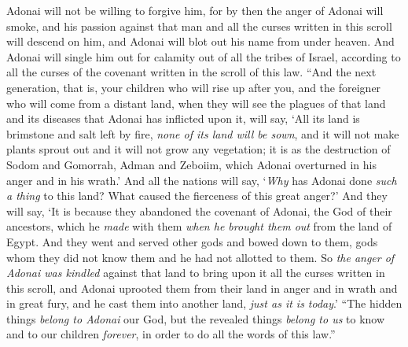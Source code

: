 \begin{biblechapter}
\verse Adonai will not be willing to forgive him, for by then the anger of Adonai will smoke, and his passion against that man and all the curses written in this scroll will descend on him, and Adonai will blot out his name from under heaven.
\verse And Adonai will single him out for calamity out of all the tribes of Israel, according to all the curses of the covenant written in the scroll of this law.
\verse “And the next generation, that is, your children who will rise up after you, and the foreigner who will come from a distant land, when they will see the plagues of that land and its diseases that Adonai has inflicted upon it, will say,
\verse ‘All its land is brimstone and salt left by fire, \textit{none of its land will be sown}, and it will not make plants sprout out and it will not grow any vegetation; it is as the destruction of Sodom and Gomorrah, Adman and Zeboiim, which Adonai overturned in his anger and in his wrath.’
\verse And all the nations will say, ‘\textit{Why} has Adonai done \textit{such a thing} to this land? What caused the fierceness of this great anger?’
\verse And they will say, ‘It is because they abandoned the covenant of Adonai, the God of their ancestors, which he \textit{made} with them \textit{when he brought them out} from the land of Egypt.
\verse And they went and served other gods and bowed down to them, gods whom they did not know them and he had not allotted to them.
\verse So \textit{the anger of Adonai was kindled} against that land to bring upon it all the curses written in this scroll,
\verse and Adonai uprooted them from their land in anger and in wrath and in great fury, and he cast them into another land, \textit{just as it is today}.’
\verse “The hidden things \textit{belong to Adonai} our God, but the revealed things \textit{belong to us} to know and to our children \textit{forever}, in order to do all the words of this law.”
\end{biblechapter}

